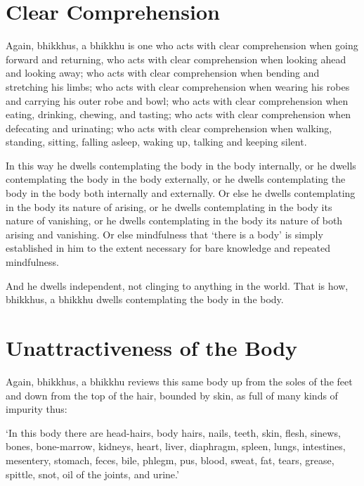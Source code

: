 
\englishPage
\section{Clear Comprehension}

Again, bhikkhus, a bhikkhu is one who acts with clear comprehension when going
forward and returning, who acts with clear comprehension when looking ahead and
looking away; who acts with clear comprehension when bending and stretching his
limbs; who acts with clear comprehension when wearing his robes and carrying his
outer robe and bowl; who acts with clear comprehension when eating, drinking,
chewing, and tasting; who acts with clear comprehension when defecating and
urinating; who acts with clear comprehension when walking, standing, sitting,
falling asleep, waking up, talking and keeping silent.

In this way he dwells contemplating the body in the body internally, or he
dwells contemplating the body in the body externally, or he dwells contemplating
the body in the body both internally and externally. Or else he dwells
contemplating in the body its nature of arising, or he dwells contemplating in
the body its nature of vanishing, or he dwells contemplating in the body its
nature of both arising and vanishing. Or else mindfulness that ‘there is a body’
is simply established in him to the extent necessary for bare knowledge and
repeated mindfulness.

And he dwells independent, not clinging to anything in the world. That is how,
bhikkhus, a bhikkhu dwells contemplating the body in the body.


\section{Unattractiveness of the Body}

Again, bhikkhus, a bhikkhu reviews this same body up from the soles of the feet
and down from the top of the hair, bounded by skin, as full of many kinds of
impurity thus:

\enlargethispage{2\baselineskip}

‘In this body there are head-hairs, body hairs, nails, teeth, skin, flesh,
sinews, bones, bone-marrow, kidneys, heart, liver, diaphragm, spleen, lungs,
intestines, mesentery, stomach, feces, bile, phlegm, pus, blood, sweat, fat,
tears, grease, spittle, snot, oil of the joints, and urine.’

